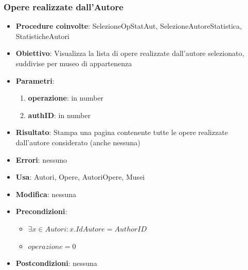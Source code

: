 \subsubsection{Opere realizzate dall’Autore}
\label{OpereRealizzate}
\begin{itemize}
	\item \textbf{Procedure coinvolte}: SelezioneOpStatAut, SelezioneAutoreStatistica, StatisticheAutori
	\item \textbf{Obiettivo}: Visualizza la lista di opere realizzate dall'autore selezionato, suddivise per museo di appartenenza
	\item \textbf{Parametri}:
	\begin{enumerate}
		\item \textbf{operazione}: in number
		\item \textbf{authID}: in number
	\end{enumerate}
	\item \textbf{Risultato}: Stampa una pagina contenente tutte le opere realizzate dall'autore considerato (anche nessuna)
	\item \textbf{Errori}: nessuno
	\item \textbf{Usa}: Autori, Opere, AutoriOpere, Musei
	\item \textbf{Modifica}: nessuna
	\item \textbf{Precondizioni}:
	\begin{itemize}
		\item $\exists x \in Autori : x.IdAutore = AuthorID$
		\item $operazione  = 0$
	\end{itemize}
	\item \textbf{Postcondizioni}: nessuna
\end{itemize}

